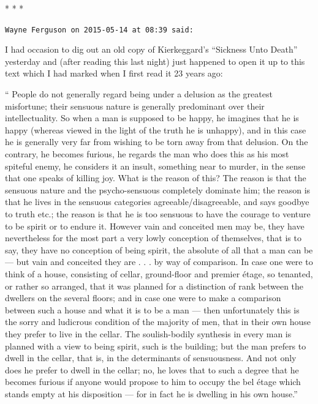 
\begin{center}* * *\end{center}

\begin{footnotesize}
\begin{sffamily}
\texttt{Wayne Ferguson on 2015-05-14 at 08:39 said:}

I had occasion to dig out an old copy of Kierkeggard's ``Sickness Unto Death'' yesterday and (after reading this last night) just happened to open it up to this text which I had marked when I first read it 23 years ago:

`` People do not generally regard being under a delusion as the greatest misfortune; their sensuous nature is generally predominant over their intellectuality. So when a man is supposed to be happy, he imagines that he is happy (whereas viewed in the light of the truth he is unhappy), and in this case he is generally very far from wishing to be torn away from that delusion. On the contrary, he becomes furious, he regards the man who does this as his most spiteful enemy, he considers it an insult, something near to murder, in the sense that one speaks of killing joy. What is the reason of this? The reason is that the sensuous nature and the psycho-sensuous completely dominate him; the reason is that he lives in the sensuous categories agreeable/disagreeable, and says goodbye to truth etc.; the reason is that he is too sensuous to have the courage to venture to be spirit or to endure it. However vain and conceited men may be, they have nevertheless for the most part a very lowly conception of themselves, that is to say, they have no conception of being spirit, the absolute of all that a man can be --- but vain and conceited they are . . . by way of comparison. In case one were to think of a house, consisting of cellar, ground-floor and premier étage, so tenanted, or rather so arranged, that it was planned for a distinction of rank between the dwellers on the several floors; and in case one were to make a comparison between such a house and what it is to be a man --- then unfortunately this is the sorry and ludicrous condition of the majority of men, that in their own house they prefer to live in the cellar. The soulish-bodily synthesis in every man is planned with a view to being spirit, such is the building; but the man prefers to dwell in the cellar, that is, in the determinants of sensuousness. And not only does he prefer to dwell in the cellar; no, he loves that to such a degree that he becomes furious if anyone would propose to him to occupy the bel étage which stands empty at his disposition --- for in fact he is dwelling in his own house.''


\end{sffamily}
\end{footnotesize}
